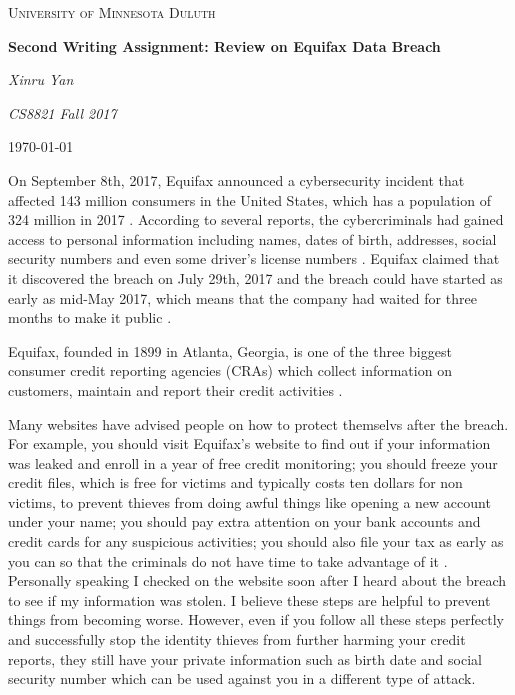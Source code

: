 \documentclass[12pt]{article}
\begin{document}
\begin{titlepage}
	\centering
	{\scshape\LARGE University of Minnesota Duluth \par}
	\vspace{1cm}
	{\scshape\Large \par}
	\vspace{1.5cm}
	{\huge\bfseries Second Writing Assignment: Review on Equifax Data Breach\par}
	\vspace{2cm}
	{\Large\itshape Xinru Yan\par}
	\vspace{2cm}
	{\Large\itshape CS8821 Fall 2017\par}

	\vfill

	{\large \today\par}
\end{titlepage}

\doublespacing

On September 8th, 2017, Equifax announced a cybersecurity incident that affected 143 million consumers in the United States, which has a population of 324 million in 2017 \cite{CI}. According to several reports, the cybercriminals had gained access to personal information including names, dates of birth, addresses, social security numbers and even some driver's license numbers \cite{CI}\cite{WS}. Equifax claimed that it discovered the breach on July 29th, 2017 and the breach could have started as early as mid-May 2017, which means that the company had waited for three months to make it public \cite{YG}.

Equifax, founded in 1899 in Atlanta, Georgia, is one of the three biggest consumer credit reporting agencies (CRAs) which collect information on customers, maintain and report their credit activities \cite{EQX}. 

Many websites have advised people on how to protect themselvs after the breach. For example, you should visit Equifax's website to find out if your information was leaked and enroll in a year of free credit monitoring; you should freeze your credit files, which is free for victims and typically costs ten dollars for non victims, to prevent thieves from doing awful things like opening a new account under your name; you should pay extra attention on your bank accounts and credit cards for any suspicious activities; you should also file your tax as early as you can so that the criminals do not have time to take advantage of it \cite{CI} \cite{AM}. Personally speaking I checked on the website soon after I heard about the breach to see if my information was stolen. I believe these steps are helpful to prevent things from becoming worse. However, even if you follow all these steps perfectly and successfully stop the identity thieves from further harming your credit reports, they still have your private information such as birth date and social security number which can be used against you in a different type of attack.
\end{document}
